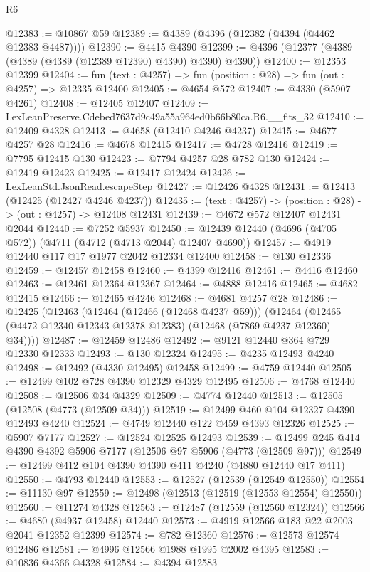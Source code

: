 \begin{lexlean}{R6}
\begin{coremodule}
@12383 := @10867 @59
@12389 := @4389 (@4396 (@12382 (@4394 (@4462 @12383 @4487))))
@12390 := @4415 @4390
@12399 := @4396 (@12377 (@4389 (@4389 (@4389 (@12389 @12390) @4390) @4390) @4390))
@12400 := @12353 @12399
@12404 := fun (text : @4257) => fun (position : @28) => fun (out : @4257) => @12335 @12400
@12405 := @4654 @572
@12407 := @4330 (@5907 @4261)
@12408 := @12405 @12407
@12409 := LexLeanPreserve.Cdebed7637d9c49a55a964ed0b66b80ca.R6.__fits_32
@12410 := @12409 @4328
@12413 := @4658 (@12410 @4246 @4237)
@12415 := @4677 @4257 @28
@12416 := @4678 @12415
@12417 := @4728 @12416
@12419 := @7795 @12415 @130
@12423 := @7794 @4257 @28 @782 @130
@12424 := @12419 @12423
@12425 := @12417 @12424
@12426 := LexLeanStd.JsonRead.escapeStep
@12427 := @12426 @4328
@12431 := @12413 (@12425 (@12427 @4246 @4237))
@12435 := (text : @4257) -> (position : @28) -> (out : @4257) -> @12408 @12431
@12439 := @4672 @572 @12407 @12431 @2044
@12440 := @7252 @5937
@12450 := @12439 @12440 (@4696 (@4705 @572)) (@4711 (@4712 (@4713 @2044) @12407 @4690))
@12457 := @4919 @12440 @117 @17 @1977 @2042 @12334 @12400
@12458 := @130 @12336
@12459 := @12457 @12458
@12460 := @4399 @12416
@12461 := @4416 @12460
@12463 := @12461 @12364 @12367
@12464 := @4888 @12416
@12465 := @4682 @12415
@12466 := @12465 @4246
@12468 := @4681 @4257 @28
@12486 := @12425
    (@12463
      (@12464 (@12466 (@12468 @4237 @59)))
      (@12464 (@12465 (@4472 @12340 @12343 @12378 @12383) (@12468 (@7869 @4237 @12360) @34))))
@12487 := @12459 @12486
@12492 := @9121 @12440 @364 @729 @12330 @12333
@12493 := @130 @12324
@12495 := @4235 @12493 @4240
@12498 := @12492 (@4330 @12495) @12458
@12499 := @4759 @12440
@12505 := @12499 @102 @728 @4390 @12329 @4329 @12495
@12506 := @4768 @12440
@12508 := @12506 @34 @4329
@12509 := @4774 @12440
@12513 := @12505 (@12508 (@4773 (@12509 @34)))
@12519 := @12499 @460 @104 @12327 @4390 @12493 @4240
@12524 := @4749 @12440 @122 @459 @4393 @12326
@12525 := @5907 @7177
@12527 := @12524 @12525 @12493
@12539 := @12499 @245 @414 @4390 @4392 @5906 @7177 (@12506 @97 @5906 (@4773 (@12509 @97)))
@12549 := @12499 @412 @104 @4390 @4390 @411 @4240 (@4880 @12440 @17 @411)
@12550 := @4793 @12440
@12553 := @12527 (@12539 (@12549 @12550))
@12554 := @11130 @97
@12559 := @12498 (@12513 (@12519 (@12553 @12554) @12550))
@12560 := @11274 @4328
@12563 := @12487 (@12559 (@12560 @12324))
@12566 := @4680 (@4937 @12458) @12440
@12573 := @4919 @12566 @183 @22 @2003 @2041 @12352 @12399
@12574 := @782 @12360
@12576 := @12573 @12574 @12486
@12581 := @4996 @12566 @1988 @1995 @2002 @4395
@12583 := @10836 @4366 @4328
@12584 := @4394 @12583

\end{coremodule}
\end{lexlean}
